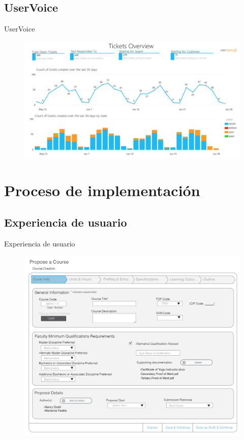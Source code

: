 \documentclass[10pt,xcolor=table ]{beamer}
\begin{document}
\subsection{UserVoice}
\begin{frame}{UserVoice}
	\begin{figure}
		\centering
	    \includegraphics[scale=0.25]{../Figuras/metricas/uservoice}
	\end{figure}
\end{frame}

\section{Proceso de implementación}
\subsection{Experiencia de usuario}
\begin{frame}{Experiencia de usuario}
	\begin{figure}[H]
		\centering
		\includegraphics[scale=0.25]{../Figuras/mockups/el_curr_2}
	\end{figure}
\end{frame}
\end{document}
